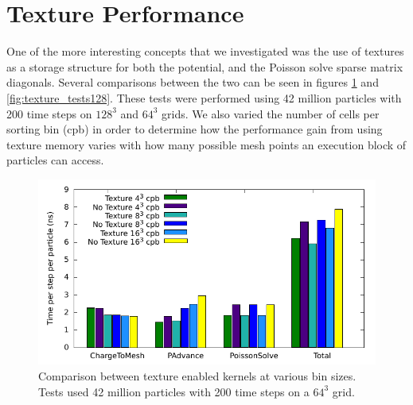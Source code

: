 	\section{Texture Performance}

One of the more interesting concepts that we investigated was the use of textures as a storage structure for both the potential, and the Poisson solve sparse matrix diagonals. Several comparisons between the two can be seen in figures \ref{fig:texture_tests64} and \ref{fig:texture_tests128}. These tests were performed using 42 million particles with 200 time steps on $128^3$ and $64^3$ grids. We also varied the number of cells per sorting bin (cpb) in order to determine how the performance gain from using texture memory varies with how many possible mesh points an execution block of particles can access.

\begin{figure}
\begin{center}
\includegraphics[width=6in]{performance/texture_tests64.pdf}
\end{center}
\caption[Comparison between texture enabled kernels on a $64^3$ grid]{Comparison between texture enabled kernels at various bin sizes. Tests used 42 million particles with 200 time steps on a $64^3$ grid.}
\label{fig:texture_tests64}
\end{figure}


